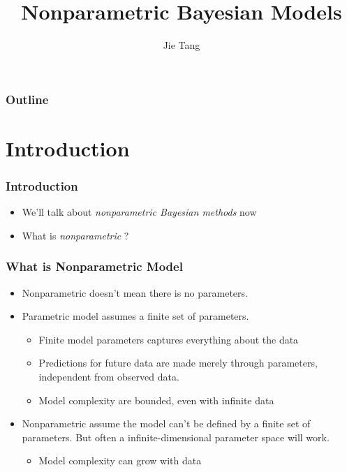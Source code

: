 \documentclass{beamer}
\title{Nonparametric Bayesian Models}
\author{Jie Tang}
\begin{document}
\begin{frame}
\titlepage
\end{frame}

\begin{frame}
\frametitle{Outline}
\tableofcontents[pausesections]
\end{frame}

\section{Introduction}
\begin{frame}
	\frametitle{Introduction}
	\begin{itemize}
		\item We'll talk about {\em nonparametric Bayesian methods} now
		\item What is {\em nonparametric} ?
	\end{itemize}
\end{frame}

\begin{frame}
	\frametitle{What is Nonparametric Model}
	\begin{itemize}
		\item Nonparametric doesn't mean there is no parameters.
		\item {\color{red} Parametric} model assumes a finite set of parameters.
		\begin{itemize}
			\item Finite model parameters captures everything about the data
			\item Predictions for future data are made merely through parameters, independent from observed data.			
			\item Model complexity are bounded, even with infinite data 	
		\end{itemize}
		\item {\color{red} Nonparametric} assume the model can't be defined by a finite set of parameters. But often a infinite-dimensional parameter space will work.
		\begin{itemize}
			\item Model complexity can grow with data
		\end{itemize}
	\end{itemize}
\end{frame}
\end{document}
